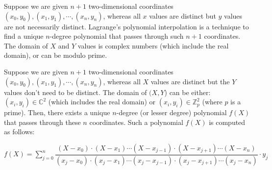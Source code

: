 Suppose we are given $n+1$ two-dimensional coordinates $(x_0, y_0), (x_1, y_1), \cdots, (x_n, y_n)$, whereas all $x$ values are distinct but $y$ values are not necessarily distinct. Lagrange's polynomial interpolation is a technique to find a unique $n$-degree polynomial that passes through such $n+1$ coordinates. The domain of $X$ and $Y$ values is complex numbers (which include the real domain), or can be modulo prime.


\begin{tcolorbox}[title={\textbf{\tboxtheorem{\ref*{sec:polynomial-interpolation}} Lagrange's Polynomial Interpolation}}]

Suppose we are given $n+1$ two-dimensional coordinates $(x_0, y_0), (x_1, y_1), \cdots, (x_n, y_n)$, whereas all $X$ values are distinct but the $Y$ values don't need to be distinct. The domain of $(X, Y$) can be either: $(x_i, y_i) \in \mathbb{C}^2$ (which includes the real domain) or $(x_i, y_i) \in \mathbb{Z}_p^2$ (where $p$ is a prime). Then, there exists a unique $n$-degree (or lesser degree) polynomial $f(X)$ that passes through these $n$ coordinates. Such a polynomial $f(X)$ is computed as follows:

$f(X) = \sum\limits_{j=0}^{n}\dfrac{(X-x_0)\cdot(X-x_1)\cdots(X-x_{j-1})\cdot(X-x_{j+1})\cdots(X-x_{n})}{(x_j-x_0)\cdot(x_j-x_1)\cdots(x_j-x_{j-1})\cdot(x_j-x_{j+1})\cdots(x_j-x_{n})}\cdot y_j$


\end{tcolorbox}

